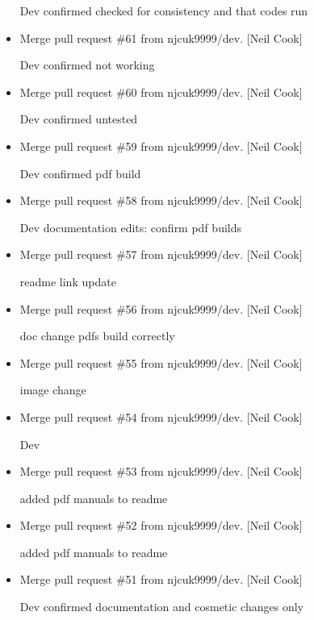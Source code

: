 \documentclass[a4paper,10pt,english]{report}
\begin{document}
\begin{itemize}
Dev \sphinxhyphen{} confirmed checked for consistency and that codes run

\item {} 
Merge pull request \#61 from njcuk9999/dev. {[}Neil Cook{]}

Dev \sphinxhyphen{} confirmed  not working

\item {} 
Merge pull request \#60 from njcuk9999/dev. {[}Neil Cook{]}

Dev \sphinxhyphen{} confirmed untested 

\item {} 
Merge pull request \#59 from njcuk9999/dev. {[}Neil Cook{]}

Dev \sphinxhyphen{} confirmed pdf build

\item {} 
Merge pull request \#58 from njcuk9999/dev. {[}Neil Cook{]}

Dev \sphinxhyphen{} documentation edits: confirm pdf builds

\item {} 
Merge pull request \#57 from njcuk9999/dev. {[}Neil Cook{]}

readme link update

\item {} 
Merge pull request \#56 from njcuk9999/dev. {[}Neil Cook{]}

doc change \sphinxhyphen{} pdfs build correctly

\item {} 
Merge pull request \#55 from njcuk9999/dev. {[}Neil Cook{]}

image change

\item {} 
Merge pull request \#54 from njcuk9999/dev. {[}Neil Cook{]}

Dev

\item {} 
Merge pull request \#53 from njcuk9999/dev. {[}Neil Cook{]}

added pdf manuals to readme

\item {} 
Merge pull request \#52 from njcuk9999/dev. {[}Neil Cook{]}

added pdf manuals to readme

\item {} 
Merge pull request \#51 from njcuk9999/dev. {[}Neil Cook{]}

Dev \sphinxhyphen{} confirmed documentation and cosmetic changes only


\end{itemize}
\end{document}
